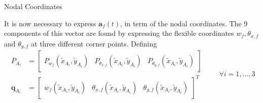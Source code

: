 \documentclass{beamer}
\begin{document}
\begin{frame}{Nodal Coordinates}

It is now necessary to express $\bm{a}_f(t)$, in term of the nodal coordinates. The 9 components of this vector are found by expressing the flexible coordinates $w_f, \theta_{x, f}$ and $\theta_{y, f}$ at three different corner points. Defining
\begin{equation*}
\begin{aligned}
P_{A_i} &= \begin{bmatrix}
P_{w_f}(\widetilde{x}_{A_i}, \widetilde{y}_{A_i}) &
P_{\theta_{x, f}}(\widetilde{x}_{A_i}, \widetilde{y}_{A_i}) & P_{\theta_{y, f}}(\widetilde{x}_{A_i}, \widetilde{y}_{A_i})
\end{bmatrix}  \\
\bm{q}_{A_i} &= \begin{bmatrix}
w_f(\widetilde{x}_{A_i}, \widetilde{y}_{A_i}) & 
\theta_{x, f}(\widetilde{x}_{A_i}, \widetilde{y}_{A_i}) & \theta_{y, f}(\widetilde{x}_{A_i}, \widetilde{y}_{A_i})  \end{bmatrix}^T 
\end{aligned}  \qquad \forall i=1,\dots,3
\end{equation*}



\end{frame}
\end{document}
